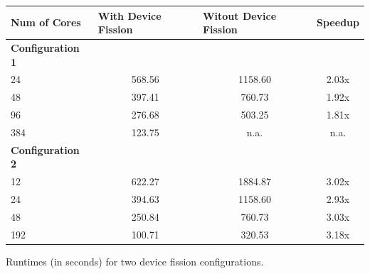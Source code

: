 \begin{tablehere}
{\footnotesize
\begin{tabular}{|p{}|p{}|p{}|p{}|}
\hline
       Num of Cores		& \multicolumn{1}{|p{1,55cm}}{With Device Fission}& \multicolumn{1}{|p{1,55cm}}{Witout Device Fission}& \multicolumn{1}{|p{1,55cm}|}{Speedup} \\ \hline
\multicolumn{1}{|l}{\textbf{Configuration 1}} & \multicolumn{1}{c}{}  & \multicolumn{1}{c}{}  & \multicolumn{1}{c|}{}  \\ \hline
      24  & \multicolumn{1}{|c}{568.56} & \multicolumn{1}{|c}{1158.60} & \multicolumn{1}{|c|}{2.03x} \\ \hline
			48  & \multicolumn{1}{|c}{397.41} & \multicolumn{1}{|c}{760.73} & \multicolumn{1}{|c|}{1.92x} \\ \hline
      96  & \multicolumn{1}{|c}{276.68} & \multicolumn{1}{|c}{503.25} & \multicolumn{1}{|c|}{1.81x} \\ \hline
      384  & \multicolumn{1}{|c}{123.75} & \multicolumn{1}{|c}{n.a.} & \multicolumn{1}{|c|}{n.a.} \\ \hline

\multicolumn{1}{|l}{\textbf{Configuration 2}} & \multicolumn{1}{l}{}  & \multicolumn{1}{l}{}  & \multicolumn{1}{l|}{}  \\ \hline
      12  & \multicolumn{1}{|c}{622.27} & \multicolumn{1}{|c}{1884.87} & \multicolumn{1}{|c|}{3.02x} \\ \hline
			24  & \multicolumn{1}{|c}{394.63} & \multicolumn{1}{|c}{1158.60} & \multicolumn{1}{|c|}{2.93x} \\ \hline
      48  & \multicolumn{1}{|c}{250.84} & \multicolumn{1}{|c}{760.73} & \multicolumn{1}{|c|}{3.03x} \\ \hline
      192  & \multicolumn{1}{|c}{100.71} & \multicolumn{1}{|c}{320.53} & \multicolumn{1}{|c|}{3.18x} \\ \hline
\end{tabular}}
  \caption{Runtimes (in seconds) for two device fission configurations.}
	\label{tab:LUDeviceFission}
\end{tablehere}

